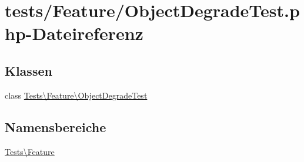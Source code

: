 \hypertarget{ObjectDegradeTest_8php}{}\section{tests/\+Feature/\+Object\+Degrade\+Test.php-\/\+Dateireferenz}
\label{ObjectDegradeTest_8php}
\subsection*{Klassen}
\begin{DoxyCompactItemize}
\item 
class \hyperlink{classTests_1_1Feature_1_1ObjectDegradeTest}{Tests\textbackslash{}\+Feature\textbackslash{}\+Object\+Degrade\+Test}
\end{DoxyCompactItemize}
\subsection*{Namensbereiche}
\begin{DoxyCompactItemize}
\item 
 \hyperlink{namespaceTests_1_1Feature}{Tests\textbackslash{}\+Feature}
\end{DoxyCompactItemize}
